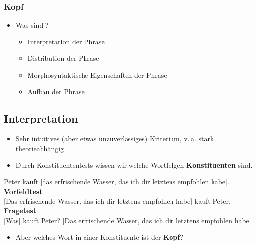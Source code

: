 \begin{frame}
\frametitle{Kopf}

\begin{itemize}
	\item Was sind ?
	\begin{itemize}
		\item Interpretation der Phrase
		\item Distribution der Phrase
		\item Morphosyntaktische Eigenschaften der Phrase
		\item Aufbau der Phrase
		
	\end{itemize}
\end{itemize}

\citep[vgl.][]{Adger04a}
\end{frame}


\subsection{Interpretation}

\begin{frame}

\begin{itemize}
	\item Sehr intuitives (aber etwas unzuverlässiges) Kriterium, v.\,a. stark theorieabhängig
	\item Durch Konstituententests wissen wir welche Wortfolgen \textbf{Konstituenten} sind.
\end{itemize}
\pause
\eal Peter kauft \alert{[das erfrischende Wasser, das ich dir letztens empfohlen habe]}.
\pause
\ex \textbf{Vorfeldtest}\\
\alert{{[}Das erfrischende Wasser, das ich dir letztens empfohlen habe]} kauft Peter. 
\pause
\ex \textbf{Fragetest}\\
\alert{{[}Was]} kauft Peter? \ras \alert{{[}Das erfrischende Wasser, das ich dir letztens empfohlen habe]}
\zl


\pause
\begin{itemize}
	\item Aber welches Wort in einer Konstituente ist der \textbf{Kopf}?
\end{itemize} 

\end{frame}


